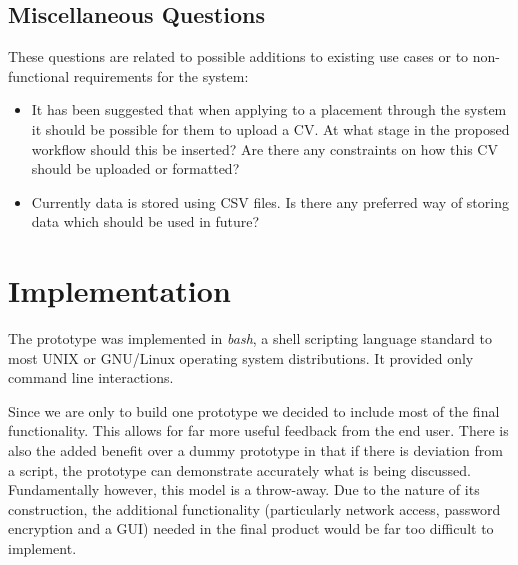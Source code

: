 \documentclass{l3deliverable}
\begin{document}
\subsection{Miscellaneous Questions}
These questions are related to possible additions to existing use cases or to non-functional requirements for the system:
\begin{itemize}
\item{It has been suggested that when applying to a placement through the system it should be possible for them to upload a CV. At what stage in the proposed workflow should this
be inserted? Are there any constraints on how this CV should be uploaded or formatted?}
\item{Currently data is stored using CSV files. Is there any preferred way of storing data which should be used in future?}
\end{itemize}



\section{Implementation}
The prototype was implemented in \emph{bash}, a shell scripting language standard to most UNIX or GNU/Linux operating system distributions. It provided only command line interactions.\\

\begin{flushleft}
Since we are only to build one prototype we decided to include most
of the final functionality. This allows for far more useful feedback
from the end user. There is also the added benefit over a dummy prototype
in that if there is deviation from a script, the prototype can demonstrate
accurately what is being discussed. Fundamentally however, this model
is a throw-away. Due to the nature of its construction, the additional
functionality (particularly network access, password encryption and
a GUI) needed in the final product would be far too difficult to implement.
\par\end{flushleft}
\end{document}

